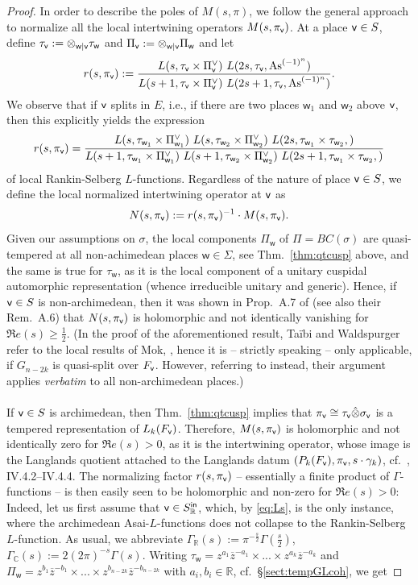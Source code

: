 \documentclass[a4paper,10pt]{amsart}
\theoremstyle{definition}
\numberwithin{equation}{section}
\def\R{\mathbb R}
\def\ww{\mathsf w}
\def\vv{{\sf v}} %
\begin{document}
\begin{proof}
In order to describe the poles of $M(s,\pi)$, we follow the general approach to normalize all the local intertwining operators $M(s,\pi_\vv)$. At a place $\vv\in S$, define $\tau_\vv:=\otimes_{\ww|\vv}\tau_\ww$ and $\Pi_\vv:=\otimes_{\ww|\vv}\Pi_\ww$ and let
$$r(s,\pi_\vv):=\frac{ L(s,\tau_\vv\times \Pi^\vee_\vv) \ L(2s, \tau_\vv, {\rm As}^{(-1)^n})}{ L(s+1,\tau_\vv\times \Pi^\vee_\vv) \ L(2s+1, \tau_\vv, {\rm As}^{(-1)^n})}.$$
We observe that if $\vv$ splits in $E$, i.e., if there are two places $\ww_1$ and $\ww_2$ above $\vv$, then this explicitly yields the expression
\begin{equation}\label{eq:Ls}
r(s,\pi_\vv)=\frac{ L(s,\tau_{\ww_1}\times \Pi^\vee_{\ww_1}) \ L(s,\tau_{\ww_2}\times \Pi^\vee_{\ww_2}) \ L(2s, \tau_{\ww_1}\times\tau_{\ww_2},)}{  L(s+1,\tau_{\ww_1}\times \Pi^\vee_{\ww_1}) \ L(s+1,\tau_{\ww_2}\times \Pi^\vee_{\ww_2}) \ L(2s+1, \tau_{\ww_1}\times\tau_{\ww_2},)}
\end{equation}
of local Rankin-Selberg $L$-functions. Regardless of the nature of place $\vv\in S$, we define the local normalized intertwining operator at $\vv$ as
$$N(s,\pi_\vv):=r(s,\pi_\vv)^{-1}\cdot M(s,\pi_\vv).$$
Given our assumptions on $\sigma$, the local components $\Pi_\ww$ of $\Pi=BC(\sigma)$ are quasi-tempered at all non-achimedean places $\ww\in \Sigma$, see Thm.\ \ref{thm:qtcusp} above, and the same is true for $\tau_\ww$, as it is the local component of a unitary cuspidal automorphic representation (whence irreducible unitary and generic). Hence, if $\vv\in S$ is non-archimedean, then it was shown in Prop.\ A.7 of \cite{CKT} (see also their Rem.\ A.6) that $N(s,\pi_\vv)$ is holomorphic and not identically vanishing for $\Re e(s)\geq \tfrac12$. (In the proof of the aforementioned result, Ta\"ibi and Waldspurger refer to the local results of Mok, \cite{mok}, hence it is -- strictly speaking -- only applicable, if $G_{n-2k}$ is quasi-split over $F_\vv$. However, referring to \cite{zou} instead, their argument applies {\it verbatim} to all non-archimedean places.)\\\\
If $\vv\in S$ is archimedean, then Thm.\ \ref{thm:qtcusp} implies that $\pi_\vv\cong\tau_\vv\hat\otimes \sigma_\vv$ is a tempered representation of $L_k(F_\vv)$. Therefore, $M(s,\pi_\vv)$ is holomorphic and not identically zero for $\Re e(s)>0$, as it is the intertwining operator, whose image is the Langlands quotient attached to the Langlands datum $(P_k(F_\vv), \pi_\vv, s\cdot\gamma_k)$, cf.\  \cite{bowa}, IV.4.2--IV.4.4. The normalizing factor $r(s,\pi_\vv)$ -- essentially a finite product of $\Gamma$-functions -- is then easily seen to be holomorphic and non-zero for $\Re e(s)>0$: Indeed, let us first assume that $\vv\in S^{\sf in}_\R$, which, by \eqref{eq:Ls}, is the only instance, where the archimedean Asai-$L$-functions does not collapse to the Rankin-Selberg $L$-function. As usual, we abbreviate $\Gamma_{\mathbb R}(s):=\pi^{-\tfrac{s}{2}}\Gamma(\tfrac{s}{2})$, $\Gamma_{\mathbb C}(s):=2(2\pi)^{-s}\Gamma(s)$. Writing $\tau_\ww= z^{a_1}\overline{z}^{-a_1}\times ...\times z^{a_k}\overline{z}^{-a_k}$ and $\Pi_\ww=z^{b_1}\overline{z}^{-b_1}\times ...\times z^{b_{n-2k}}\overline{z}^{-b_{n-2k}}$ with $a_i,b_i\in \R$, cf.\ \S \ref{sect:tempGLcoh}, we get 

\end{proof}
\end{document}
